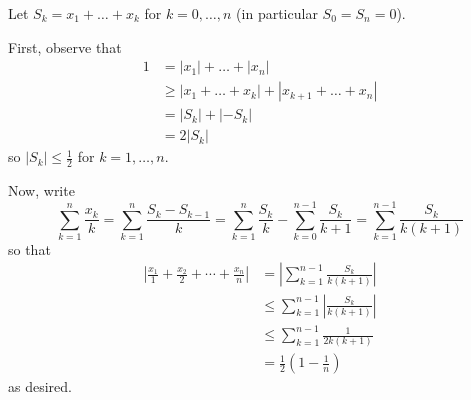 Let $S_k=x_1+\ldots+x_k$ for $k=0,\ldots,n$ (in particular $S_0=S_n=0$).

First, observe that
\begin{align*}
	1&=|x_1|+\ldots+|x_n|\\
	&\geq|x_1+\ldots+x_k|+|x_{k+1}+\ldots+x_n|\\
	&=|S_k|+|-S_k|\\
	&=2|S_k|
\end{align*}
so $|S_k|\leq\frac{1}{2}$ for $k=1,\ldots,n$.

Now, write \[\sum_{k=1}^n\frac{x_k}{k}=\sum_{k=1}^n\frac{S_k-S_{k-1}}{k}=\sum_{k=1}^n\frac{S_k}{k}-\sum_{k=0}^{n-1}\frac{S_k}{k+1}=\sum_{k=1}^{n-1}\frac{S_k}{k(k+1)}\] so that
\begin{align*}
	\left|\frac{x_1}{1}+\frac{x_2}{2}+\cdots+\frac{x_n}{n}\right|&=\left|\sum_{k=1}^{n-1}\frac{S_k}{k(k+1)}\right|\\
	&\leq\sum_{k=1}^{n-1}\left|\frac{S_k}{k(k+1)}\right|\\
	&\leq\sum_{k=1}^{n-1}\frac{1}{2k(k+1)}\\
	&=\frac{1}{2}\left(1-\frac{1}{n}\right)
\end{align*}
as desired.